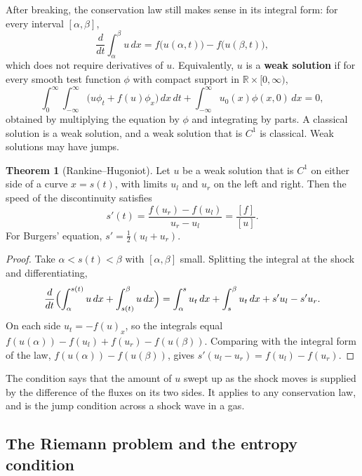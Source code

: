 \documentclass[11pt,a4paper]{article}
\numberwithin{equation}{section}
\theoremstyle{definition}
\newtheorem{thm}{Theorem}[subsection]
\begin{document}
After breaking, the conservation law still makes sense in its integral form: for every interval $[\alpha, \beta]$,
\[
\frac{d}{dt}\int_\alpha^\beta u\,dx = f\bigl(u(\alpha, t)\bigr) - f\bigl(u(\beta, t)\bigr) ,
\]
which does not require derivatives of $u$. Equivalently, $u$ is a \textbf{weak solution} if for every smooth test function $\phi$ with compact support in $\mathbb R \times [0, \infty)$,
\[
\int_0^\infty\!\!\int_{-\infty}^\infty\bigl(u\phi_t + f(u)\phi_x\bigr)\,dx\,dt + \int_{-\infty}^\infty u_0(x)\phi(x, 0)\,dx = 0 ,
\]
obtained by multiplying the equation by $\phi$ and integrating by parts. A classical solution is a weak solution, and a weak solution that is $C^1$ is classical. Weak solutions may have jumps.

\begin{thm}[Rankine--Hugoniot]
\label{thm:rh}
Let $u$ be a weak solution that is $C^1$ on either side of a curve $x = s(t)$, with limits $u_l$ and $u_r$ on the left and right. Then the speed of the discontinuity satisfies
\[
s'(t) = \frac{f(u_r) - f(u_l)}{u_r - u_l} = \frac{[f]}{[u]} .
\]
For Burgers' equation, $s' = \frac12(u_l + u_r)$.
\end{thm}

\begin{proof}
Take $\alpha < s(t) < \beta$ with $[\alpha, \beta]$ small. Splitting the integral at the shock and differentiating,
\[
\frac{d}{dt}\Bigl(\int_\alpha^{s(t)}u\,dx + \int_{s(t)}^\beta u\,dx\Bigr) = \int_\alpha^{s}u_t\,dx + \int_{s}^\beta u_t\,dx + s'u_l - s'u_r .
\]
On each side $u_t = -f(u)_x$, so the integrals equal $f(u(\alpha)) - f(u_l) + f(u_r) - f(u(\beta))$. Comparing with the integral form of the law, $f(u(\alpha)) - f(u(\beta))$, gives $s'(u_l - u_r) = f(u_l) - f(u_r)$.
\end{proof}

The condition says that the amount of $u$ swept up as the shock moves is supplied by the difference of the fluxes on its two sides. It applies to any conservation law, and is the jump
condition across a shock wave in a gas.

\subsection{The Riemann problem and the entropy condition}
\label{ssec:riemann}
\end{document}
